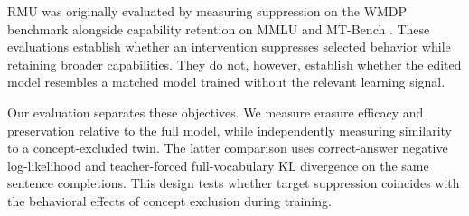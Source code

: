 RMU was originally evaluated by measuring suppression on the WMDP benchmark
alongside capability retention on MMLU and MT-Bench
\citep{li2024wmdp}. These evaluations establish whether an intervention
suppresses selected behavior while retaining broader capabilities. They do
not, however, establish whether the edited model resembles a matched model
trained without the relevant learning signal.

Our evaluation separates these objectives. We measure erasure efficacy and
preservation relative to the full model, while independently measuring
similarity to a concept-excluded twin. The latter comparison uses
correct-answer negative log-likelihood and teacher-forced full-vocabulary KL
divergence on the same sentence completions. This design tests whether target
suppression coincides with the behavioral effects of concept exclusion during
training.

